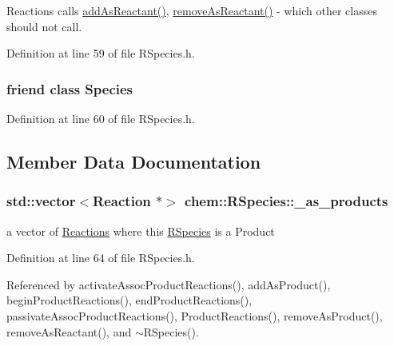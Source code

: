 Reactions calls \hyperlink{classchem_1_1RSpecies_a88c4e30858e503105a3fa39e649060ef}{add\-As\-Reactant()}, \hyperlink{classchem_1_1RSpecies_ad0a8e2da5b7a0362b1fb20ad72671005}{remove\-As\-Reactant()} -\/ which other classes should not call. 



Definition at line 59 of file R\-Species.\-h.

\hypertarget{classchem_1_1RSpecies_a4f9920dbd864c252e3275a3f4f09dd84}{
\subsubsection[{Species}]{\setlength{\rightskip}{0pt plus 5cm}friend class {\bf Species}}}\label{classchem_1_1RSpecies_a4f9920dbd864c252e3275a3f4f09dd84}


Definition at line 60 of file R\-Species.\-h.



\subsection{Member Data Documentation}
\hypertarget{classchem_1_1RSpecies_a680c86be9b2ef8f87525291fabb15f11}{
\subsubsection[{\-\_\-as\-\_\-products}]{\setlength{\rightskip}{0pt plus 5cm}std\-::vector$<${\bf Reaction} $\ast$$>$ {\bf chem\-::\-R\-Species\-::\-\_\-as\-\_\-products}}}\label{classchem_1_1RSpecies_a680c86be9b2ef8f87525291fabb15f11}


a vector of \hyperlink{classchem_1_1Reaction}{Reactions} where this \hyperlink{classchem_1_1RSpecies}{R\-Species} is a Product 



Definition at line 64 of file R\-Species.\-h.



Referenced by activate\-Assoc\-Product\-Reactions(), add\-As\-Product(), begin\-Product\-Reactions(), end\-Product\-Reactions(), passivate\-Assoc\-Product\-Reactions(), Product\-Reactions(), remove\-As\-Product(), remove\-As\-Reactant(), and $\sim$\-R\-Species().

